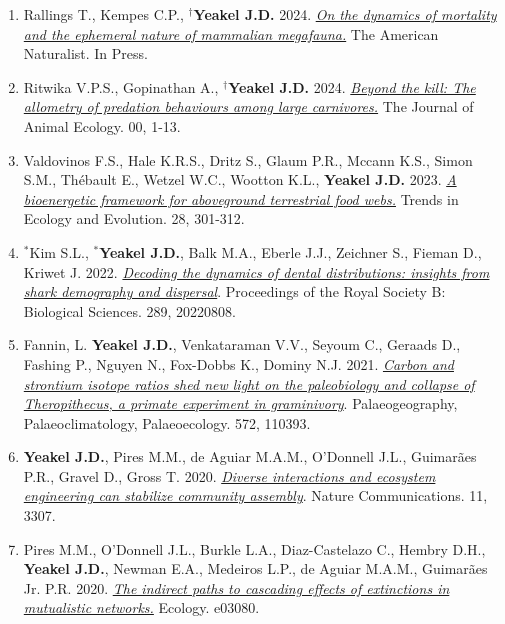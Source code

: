 \documentclass[margin,line,12pt]{res}
\begin{document}
\begin{resume}
\begin{enumerate}
\item Rallings T., Kempes C.P., \textbf{${}^\dag$Yeakel J.D.} 2024. \href{https://www.journals.uchicago.edu/doi/abs/10.1086/731331}{\emph{On the dynamics of mortality and the ephemeral nature of mammalian megafauna.}} The American Naturalist. In Press.

\item Ritwika V.P.S., Gopinathan A., \textbf{${}^\dag$Yeakel J.D.} 2024. \href{https://besjournals.onlinelibrary.wiley.com/doi/10.1111/1365-2656.14070}{\emph{Beyond the kill: The allometry of predation behaviours among large carnivores.}} The Journal of Animal Ecology. 00, 1-13.

\item Valdovinos F.S., Hale K.R.S., Dritz S., Glaum P.R., Mccann K.S., Simon S.M., Thébault E., Wetzel W.C., Wootton K.L.,  \textbf{Yeakel J.D.} 2023. \href{https://www.sciencedirect.com/science/article/pii/S0169534722002841}{\emph{A bioenergetic framework for aboveground terrestrial food webs.}} Trends in Ecology and Evolution. 28, 301-312.

\item ${}^\ast$Kim S.L., \textbf{${}^\ast$Yeakel J.D.}, Balk M.A., Eberle J.J., Zeichner S., Fieman D., Kriwet J. 2022. \href{https://doi.org/10.1098/rspb.2022.0808}{\emph{Decoding the dynamics of dental distributions: insights from shark demography and dispersal}}. Proceedings of the Royal Society B: Biological Sciences. 289, 20220808.

\item Fannin, L. \textbf{Yeakel J.D.}, Venkataraman V.V., Seyoum C., Geraads D., Fashing P., Nguyen N., Fox-Dobbs K., Dominy N.J.  2021. \href{https://doi.org/10.1016/j.palaeo.2021.110393}{\emph{ Carbon and strontium isotope ratios shed new light on the paleobiology and collapse of Theropithecus, a primate experiment in graminivory}}. Palaeogeography, Palaeoclimatology, Palaeoecology. 572, 110393.

\item \textbf{Yeakel J.D.}, Pires M.M., de Aguiar M.A.M., O'Donnell J.L., Guimar\~aes P.R., Gravel D., Gross T. 2020. \href{https://www.nature.com/articles/s41467-020-17164-x}{\emph{Diverse interactions and ecosystem engineering can stabilize community assembly}}. Nature Communications. 11, 3307.

\item Pires M.M., O'Donnell J.L., Burkle L.A., Diaz-Castelazo C., Hembry D.H., \textbf{Yeakel J.D.}, Newman E.A., Medeiros L.P., de Aguiar M.A.M., Guimar\~aes Jr. P.R. 2020. \href{https://esajournals.onlinelibrary.wiley.com/doi/pdf/10.1002/ecy.3080}{\emph{The indirect paths to cascading effects of extinctions in mutualistic networks.}} Ecology. e03080.


\end{enumerate}
\end{resume}
\end{document}
